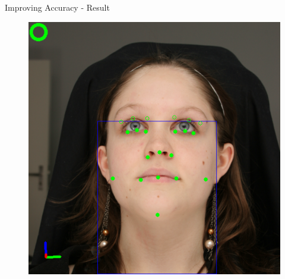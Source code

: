\documentclass{beamer}
\begin{document}
\begin{frame}{Improving Accuracy - Result}
{\begin{figure}
\includegraphics[scale=0.15]{fig/box_example3}
\end{figure}
}
\end{frame}
\end{document}
